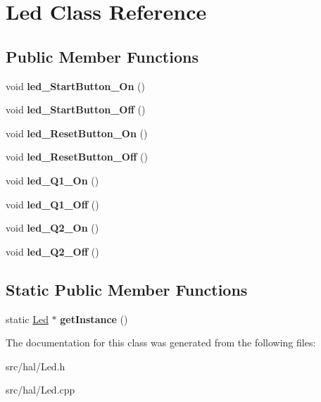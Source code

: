 \hypertarget{classLed}{\section{Led Class Reference}
\label{classLed}
}
\subsection*{Public Member Functions}
\begin{DoxyCompactItemize}
\item 
\hypertarget{classLed_ae975e138319b442936117fba1ec3a618}{void {\bfseries led\-\_\-\-Start\-Button\-\_\-\-On} ()}\label{classLed_ae975e138319b442936117fba1ec3a618}

\item 
\hypertarget{classLed_af7dc6d8a2760d1dbe61f5219d72a9613}{void {\bfseries led\-\_\-\-Start\-Button\-\_\-\-Off} ()}\label{classLed_af7dc6d8a2760d1dbe61f5219d72a9613}

\item 
\hypertarget{classLed_a4f13d40b3e284aae8679b584f223db29}{void {\bfseries led\-\_\-\-Reset\-Button\-\_\-\-On} ()}\label{classLed_a4f13d40b3e284aae8679b584f223db29}

\item 
\hypertarget{classLed_a153abe5004c72fc1bede1035e3615c56}{void {\bfseries led\-\_\-\-Reset\-Button\-\_\-\-Off} ()}\label{classLed_a153abe5004c72fc1bede1035e3615c56}

\item 
\hypertarget{classLed_a8d188ba11a0c97cc01389a83d66003a5}{void {\bfseries led\-\_\-\-Q1\-\_\-\-On} ()}\label{classLed_a8d188ba11a0c97cc01389a83d66003a5}

\item 
\hypertarget{classLed_a49f3d340c9ce2ca8edc1483678c2ef97}{void {\bfseries led\-\_\-\-Q1\-\_\-\-Off} ()}\label{classLed_a49f3d340c9ce2ca8edc1483678c2ef97}

\item 
\hypertarget{classLed_a9dbd288be5f39d9b7f01c873593d4f1f}{void {\bfseries led\-\_\-\-Q2\-\_\-\-On} ()}\label{classLed_a9dbd288be5f39d9b7f01c873593d4f1f}

\item 
\hypertarget{classLed_a75b30e02b600f8c2237053f86fe17da7}{void {\bfseries led\-\_\-\-Q2\-\_\-\-Off} ()}\label{classLed_a75b30e02b600f8c2237053f86fe17da7}

\end{DoxyCompactItemize}
\subsection*{Static Public Member Functions}
\begin{DoxyCompactItemize}
\item 
\hypertarget{classLed_ab7c85469a3885c9ec891daca461f3a16}{static \hyperlink{classLed}{Led} $\ast$ {\bfseries get\-Instance} ()}\label{classLed_ab7c85469a3885c9ec891daca461f3a16}

\end{DoxyCompactItemize}


The documentation for this class was generated from the following files\-:\begin{DoxyCompactItemize}
\item 
src/hal/Led.\-h\item 
src/hal/Led.\-cpp\end{DoxyCompactItemize}
